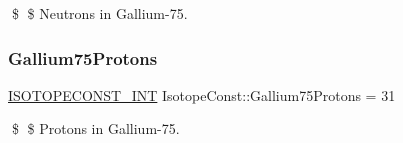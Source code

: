 \$ \$ Neutrons in Gallium-\/75. \mbox{\label{group___isotope_const-_gallium-_ga75_ga2640b378f591a4dcddeb89acda70ff1a}} 
\subsubsection{\texorpdfstring{Gallium75\+Protons}{Gallium75Protons}}
{\footnotesize\ttfamily \mbox{\hyperlink{group___isotope_const-_macros_ga5f18360b3e99483a35c32d789e62621c}{I\+S\+O\+T\+O\+P\+E\+C\+O\+N\+S\+T\+\_\+\+I\+NT}} Isotope\+Const\+::\+Gallium75\+Protons = 31}

\$ \$ Protons in Gallium-\/75. 